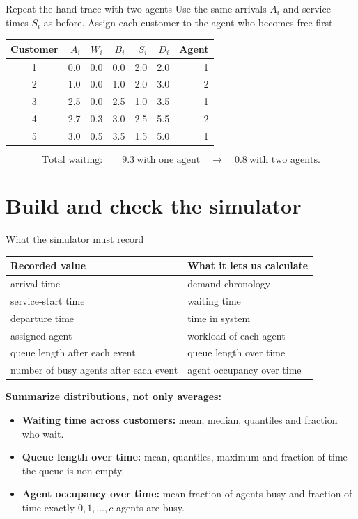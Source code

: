 \documentclass{beamer}
\begin{document}
\begin{frame}{Repeat the hand trace with two agents}
  \small
  Use the same arrivals $A_i$ and service times $S_i$ as before. Assign each
  customer to the agent who becomes free first.

  \vspace{0.5em}
  \centering
  \setlength{\tabcolsep}{5pt}
  \begin{tabular}{@{}crrrrrr@{}}
    \toprule
    Customer & $A_i$ & $W_i$ & $B_i$ & $S_i$ & $D_i$ & Agent\\
    \midrule
    1 & 0.0 & 0.0 & 0.0 & 2.0 & 2.0 & 1\\
    2 & 1.0 & 0.0 & 1.0 & 2.0 & 3.0 & 2\\
    3 & 2.5 & 0.0 & 2.5 & 1.0 & 3.5 & 1\\
    4 & 2.7 & 0.3 & 3.0 & 2.5 & 5.5 & 2\\
    5 & 3.0 & 0.5 & 3.5 & 1.5 & 5.0 & 1\\
    \bottomrule
  \end{tabular}

  \vspace{0.8em}
  \normalsize
  \[
    \text{Total waiting:}\qquad
    9.3\ \text{with one agent}
    \quad\longrightarrow\quad
    0.8\ \text{with two agents}.
  \]
\end{frame}

\section{Build and check the simulator}


\begin{frame}{What the simulator must record}
  \small
  \begin{tabular}{@{}ll@{}}
    \toprule
    Recorded value & What it lets us calculate\\
    \midrule
    arrival time & demand chronology\\
    service-start time & waiting time\\
    departure time & time in system\\
    assigned agent & workload of each agent\\
    queue length after each event & queue length over time\\
    number of busy agents after each event & agent occupancy over time\\
    \bottomrule
  \end{tabular}
  \par
  \vspace{0.55em}
  \textbf{Summarize distributions, not only averages:}
  \begin{itemize}
    \item \textbf{Waiting time across customers:} mean, median, quantiles and fraction who wait.
    \item \textbf{Queue length over time:} mean, quantiles, maximum and fraction of time the queue is non-empty.
    \item \textbf{Agent occupancy over time:} mean fraction of agents busy and fraction of time exactly $0,1,\ldots,c$ agents are busy.
  \end{itemize}
\end{frame}
\end{document}
